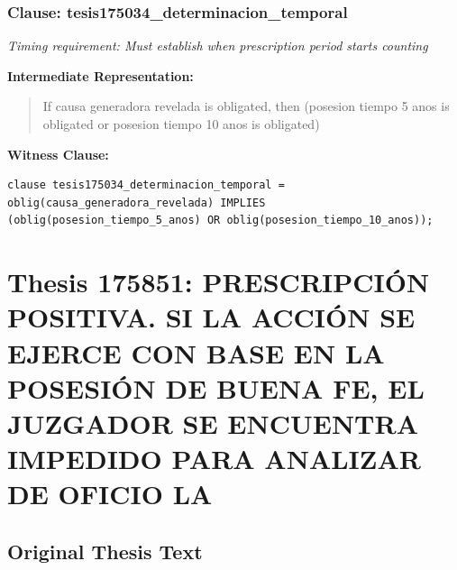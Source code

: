 \documentclass[11pt,a4paper]{article}
\begin{document}
\subsubsection{Clause: tesis175034\_determinacion\_temporal}

\textit{Timing requirement: Must establish when prescription period starts counting}

\textbf{Intermediate Representation:}

\begin{quote}
If causa generadora revelada is obligated, then (posesion tiempo 5 anos is obligated or posesion tiempo 10 anos is obligated)
\end{quote}

\textbf{Witness Clause:}

\begin{lstlisting}[style=witnessstyle, language=Witness]
clause tesis175034_determinacion_temporal = oblig(causa_generadora_revelada) IMPLIES (oblig(posesion_tiempo_5_anos) OR oblig(posesion_tiempo_10_anos));
\end{lstlisting}

\newpage

\section{Thesis 175851: PRESCRIPCIÓN POSITIVA. SI LA ACCIÓN SE EJERCE CON BASE EN LA POSESIÓN DE BUENA FE, EL JUZGADOR SE ENCUENTRA IMPEDIDO PARA ANALIZAR DE OFICIO LA}
\label{thesis:175851}

\subsection{Original Thesis Text}
\end{document}
